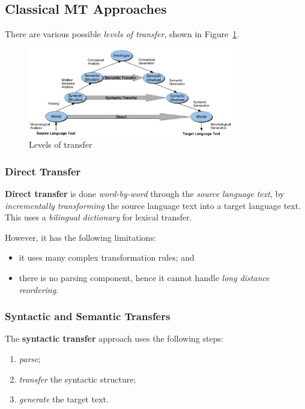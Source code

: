 \subsection{Classical MT Approaches}
There are various possible \emph{levels of transfer}, shown in Figure~\ref{fig:levels_of_transfer}.
\begin{figure}[!hbtp]
	\centering
	\includegraphics[width=0.8\textwidth]{img/levels_of_transfer}
	\caption{Levels of transfer}
	\label{fig:levels_of_transfer}
\end{figure}

\subsubsection{Direct Transfer}
\textbf{Direct transfer} is done \emph{word-by-word} through the \emph{source language text}, by \emph{incrementally transforming} the source language text into a target language text.
This uses a \emph{bilingual dictionary} for lexical transfer.

However, it has the following limitations:
\begin{itemize}
	\item it uses many complex transformation rules; and
	\item there is no parsing component, hence it cannot handle \emph{long distance reordering}.
\end{itemize}

\subsubsection{Syntactic and Semantic Transfers}
The \textbf{syntactic transfer} approach uses the following steps:
\begin{enumerate}
	\item \emph{parse};
	\item \emph{transfer} the syntactic structure;
	\item \emph{generate} the target text.
\end{enumerate}

